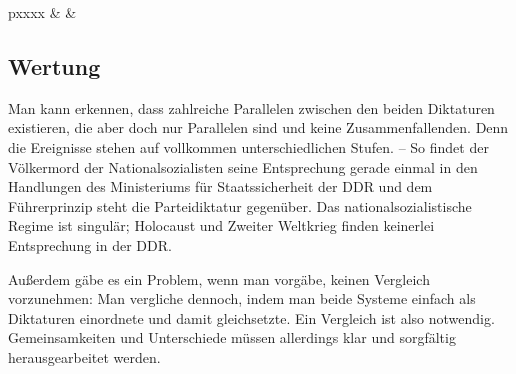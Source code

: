 {\begin{supertabular*}{\textwidth}{p{\frstcolwdth}xxxx}
&
&
\\

\end{supertabular*}
}


\subsection*{Wertung}


Man kann erkennen, dass zahlreiche Parallelen zwischen den beiden
Diktaturen existieren, die aber doch nur Parallelen sind und keine
Zusammenfallenden. Denn die Ereignisse stehen auf vollkommen
unterschiedlichen Stufen. -- So findet der Völkermord der
Nationalsozialisten seine Entsprechung gerade einmal in den Handlungen
des Ministeriums für Staatssicherheit der DDR und dem Führerprinzip
steht die Parteidiktatur gegenüber. Das nationalsozialistische Regime
ist singulär; Holocaust und Zweiter Weltkrieg finden keinerlei
Entsprechung in der DDR.

Außerdem gäbe es ein Problem, wenn man vorgäbe, keinen Vergleich
vorzunehmen: Man vergliche dennoch, indem man beide Systeme einfach
als Diktaturen einordnete und damit gleichsetzte. Ein Vergleich ist
also notwendig. Gemeinsamkeiten und Unterschiede müssen allerdings
klar und sorgfältig herausgearbeitet werden.
